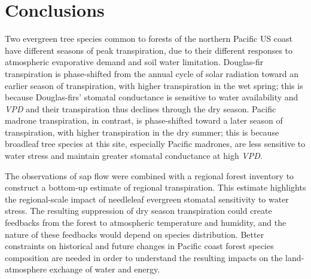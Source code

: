 \section{Conclusions}
Two evergreen tree species common to forests of the northern Pacific US coast have different seasons of peak transpiration, due to their different responses to atmospheric evaporative demand and soil water limitation.  Douglas-fir transpiration is phase-shifted from the annual cycle of solar radiation toward an earlier season of transpiration, with higher transpiration in the wet spring; this is because Douglas-firs' stomatal conductance is sensitive to water availability and \textit{VPD} and their transpiration thus declines through the dry season.  Pacific madrone transpiration, in contrast, is phase-shifted toward a later season of transpiration, with higher transpiration in the dry summer; this is because broadleaf tree species at this site, especially Pacific madrones, are less sensitive to water stress and maintain greater stomatal conductance at high \textit{VPD}.

The observations of sap flow were combined with a regional forest inventory to construct a bottom-up estimate of regional transpiration.  This estimate highlights the regional-scale impact of needleleaf evergreen stomatal sensitivity to water stress.  The resulting suppression of dry season transpiration could create feedbacks from the forest to atmospheric temperature and humidity, and the nature of these feedbacks would depend on species distribution.  Better constraints on historical and future changes in Pacific coast forest species composition are needed in order to understand the resulting impacts on the land-atmosphere exchange of water and energy.
